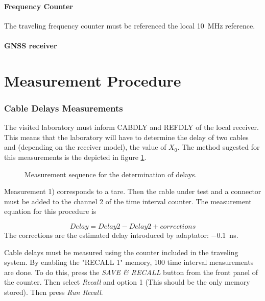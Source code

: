\documentclass[11pt]{article}
\begin{document}
\subsection{Frequency Counter}
The traveling frequency counter must be referenced the local \SI{10}{\mega\hertz} reference.



\subsection{GNSS receiver}






\part{Measurement Procedure }

\section{Cable Delays Measurements}

The visited laboratory must inform CABDLY and REFDLY of the local receiver. This means that the laboratory will have to determine the delay of two cables and (depending on the receiver model), the value of $X_0$.
The method sugested for this measurements is the depicted in figure \ref{fig:DUTdelaymeasurement}.


\begin{figure}[ht]
\begin{center}

\caption{Measurement sequence for the determination of delays.} \label{fig:DUTdelaymeasurement}
\end{center}
\end{figure}

Measurement 1) corresponds to a tare. Then the cable under test and a connector must be added to the channel 2 of the time interval counter. The measurement equation for this procedure is 

\begin{equation}
Delay = Delay2 - Delay2 + corrections
\end{equation}
The corrections are the estimated delay introduced by adaptator: \SI{-0.1}{\nano\second}. 


Cable delays must be measured using the counter included in the traveling system. By enabling the "RECALL 1" memory, 100 time interval measurements are done. To do this, press the \textit{SAVE \& RECALL} button from the front panel of the counter. Then select \textit{Recall} and option 1 (This should be the only memory stored). Then press \textit{Run Recall}.
\end{document}

